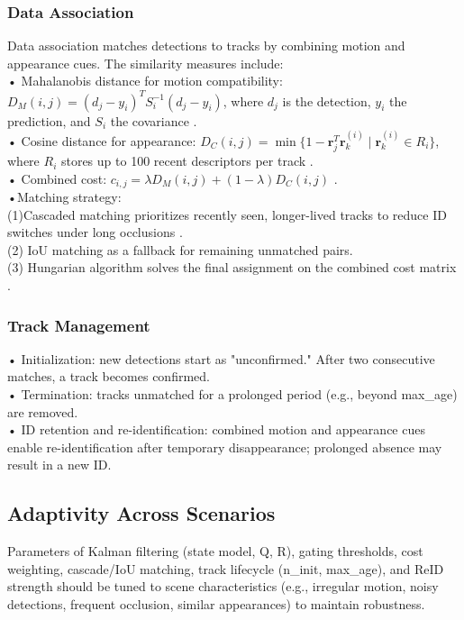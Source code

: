 \subsubsection{Data Association}
Data association matches detections to tracks by combining motion and appearance cues. The similarity measures include:\\
• Mahalanobis distance for motion compatibility: $D_M(i, j) = (d_j - y_i)^T S_i^{-1} (d_j - y_i)$, where $d_j$ is the detection, $y_i$ the prediction, and $S_i$ the covariance \cite{105}.\\
• Cosine distance for appearance: $D_C(i, j) = \min \{ 1 - \mathbf{r}_j^T \mathbf{r}_k^{(i)} \mid \mathbf{r}_k^{(i)} \in R_i \}$, where $R_i$ stores up to 100 recent descriptors per track \cite{105}.\\
• Combined cost: $c_{i,j} = \lambda D_M(i,j) + (1-\lambda) D_C(i,j)$ \cite{105}.\\
•Matching strategy:\\
(1)Cascaded matching prioritizes recently seen, longer-lived tracks to reduce ID switches under long occlusions \cite{134}.\\
(2) IoU matching as a fallback for remaining unmatched pairs.\\
(3) Hungarian algorithm solves the final assignment on the combined cost matrix \cite{103}.
\subsubsection{Track Management}
• Initialization: new detections start as "unconfirmed." After two consecutive matches, a track becomes confirmed.\\  
• Termination: tracks unmatched for a prolonged period (e.g., beyond max\_age) are removed.\\
• ID retention and re-identification: combined motion and appearance cues enable re-identification after temporary disappearance; prolonged absence may result in a new ID.

\subsection{Adaptivity Across Scenarios}
Parameters of Kalman filtering (state model, Q, R), gating thresholds, cost weighting, cascade/IoU matching, track lifecycle (n\_init, max\_age), and ReID strength should be tuned to scene characteristics (e.g., irregular motion, noisy detections, frequent occlusion, similar appearances) to maintain robustness.

